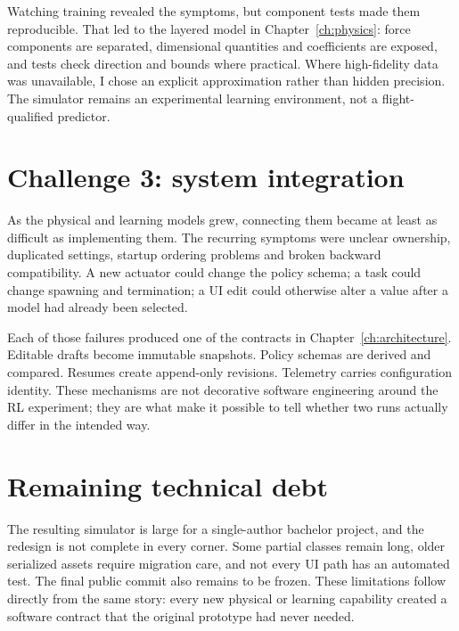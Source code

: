 Watching training revealed the symptoms, but component tests made them reproducible. That led to
the layered model in Chapter~\ref{ch:physics}: force components are separated, dimensional
quantities and coefficients are exposed, and tests check direction and bounds where practical.
Where high-fidelity data was unavailable, I chose an explicit approximation rather than hidden
precision. The simulator remains an experimental learning environment, not a flight-qualified
predictor.

\section{Challenge 3: system integration}

As the physical and learning models grew, connecting them became at least as difficult as
implementing them. The recurring symptoms were unclear ownership, duplicated settings, startup
ordering problems and broken backward compatibility. A new actuator could change the policy
schema; a task could change spawning and termination; a UI edit could otherwise alter a value
after a model had already been selected.

Each of those failures produced one of the contracts in Chapter~\ref{ch:architecture}. Editable
drafts become immutable snapshots. Policy schemas are derived and compared. Resumes create
append-only revisions. Telemetry carries configuration identity. These mechanisms are not
decorative software engineering around the RL experiment; they are what make it possible to
tell whether two runs actually differ in the intended way.

\section{Remaining technical debt}

The resulting simulator is large for a single-author bachelor project, and the redesign is not
complete in every corner. Some partial classes remain long, older serialized assets require
migration care, and not every UI path has an automated test. The final public commit also remains
to be frozen. These limitations follow directly from the same story: every new physical or
learning capability created a software contract that the original prototype had never needed.
